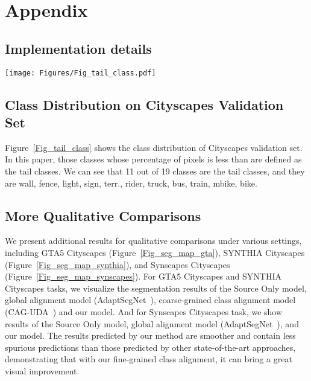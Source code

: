 \documentclass[runningheads]{llncs}
\begin{document}



\clearpage


\section*{Appendix}
\renewcommand{\thesubsection}{\Alph{subsection}}

\subsection{Implementation details}
\label{appendix:implementation}


\begin{figure*}
   \centering
   \texttt{[image: Figures/Fig\_tail\_class.pdf]}\vspace{-2mm}
   \caption{Class distribution on Cityscapes validation set. The tail classes are highlighted in \textcolor{blue}{blue}.}
   \label{Fig_tail_class}
\end{figure*}

\subsection{Class Distribution on Cityscapes Validation Set}
\label{appendix:tail_class}
Figure~\ref{Fig_tail_class} shows the class distribution of Cityscapes validation set. In this paper, those classes whose percentage of pixels is less than  are defined as the tail classes. We can see that 11 out of 19 classes are the tail classes, and they are wall, fence, light, sign, terr., rider, truck, bus, train, mbike, bike.

\subsection{More Qualitative Comparisons}
\label{appendix:qualitative}
We present additional results for qualitative comparisons under various settings, including GTA5  Cityscapes (Figure~\ref{Fig_seg_map_gta}), SYNTHIA  Cityscapes (Figure~\ref{Fig_seg_map_synthia}), and Synscapes  Cityscapes (Figure~\ref{Fig_seg_map_synscapes}). 
For GTA5  Cityscapes and SYNTHIA  Cityscapes tasks, we visualize the segmentation results of the Source Only model, global alignment model (AdaptSegNet~\cite{tsai2018learning}), coarse-grained class alignment model (CAG-UDA~\cite{zhang2019category}) and our model. And for Synscapes  Cityscapes task, we show results of the Source Only model, global alignment model (AdaptSegNet~\cite{tsai2018learning}), and our model. The results predicted by our method are smoother and contain less spurious predictions than those predicted by other state-of-the-art approaches, demonstrating that with our fine-grained class alignment, it can bring a great visual improvement.
\end{document}
